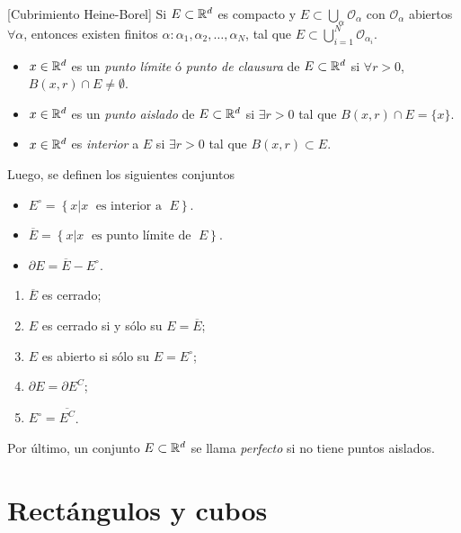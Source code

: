 \begin{teorema}{}[Cubrimiento Heine-Borel]
Si $E \subset \mathbb{R}^d$ es compacto y $E\subset \bigcup\limits_{\alpha} \mathcal{O}_{\alpha}$
con $\mathcal{O}_{\alpha}$ abiertos $\forall \alpha$, entonces existen finitos $\alpha:\alpha_1,\alpha_2, \ldots,\alpha_N$, tal que 
$E \subset \bigcup\limits_{i=1}^N \mathcal{O}_{\alpha_i}$.
\end{teorema}

\begin{itemize}
    \item $x \in \mathbb{R}^d$ es un \emph{punto l\'imite} \'o \emph{punto de clausura} de $E\subset \mathbb{R}^d$
    si $\forall r>0$,\; $B(x,r)\cap E \neq \emptyset$.
    \item $x \in \mathbb{R}^d$ es un \emph{punto aislado} de $E\subset \mathbb{R}^d$ si $\exists r>0$ tal que $B(x,r)\cap E=\{x\}$.
    \item $x \in \mathbb{R}^d$ es \emph{interior} a $E$ si $\exists r>0$ tal que $B(x,r) \subset E$.
\end{itemize}

Luego, se definen los siguientes conjuntos 
\begin{itemize}
    \item $E^{\circ}=\left\{x| x \;\mbox{ es interior a }\; E \right\}$.
    \item $\overline{E}=\left\{x| x \;\mbox{ es punto l\'imite de }\; E \right\}$.
    \item     $\partial E=\overline{E}-E^{\circ}$.
\end{itemize}

\begin{ejercicio}{}
\begin{enumerate}
    \item $\overline{E}$ es cerrado;
    \item $E$ es cerrado si y s\'olo su $E=\overline{E}$;
    \item $E$ es abierto si  s\'olo su $E=E^{\circ}$;
    \item $\partial E = \partial E^C$;
    \item $E^{\circ} = \overline{E^C}$.
\end{enumerate}
\end{ejercicio}

Por \'ultimo, un conjunto $E \subset \mathbb{R}^d$ se llama \emph{perfecto} si no tiene puntos aislados.

\section{Rect\'angulos y cubos}